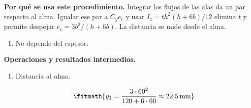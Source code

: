 \noindent\textbf{Por qué se usa este procedimiento.} Integrar los flujos de las alas da un par respecto al alma. Igualar ese par a $C_y e_c$ y usar $I_z=th^2(h+6b)/12$ elimina $t$ y permite despejar $e_c=3b^2/(h+6b)$. La distancia se mide desde el alma.

\begin{enumerate}

\item No depende del espesor.

\end{enumerate}

\noindent\textbf{Operaciones y resultados intermedios.}

\begin{enumerate}

\item Distancia al alma.

\[\fitmath{y_{1}=\frac{3\cdot {60}^{2}}{120+6\cdot 60}\approx 22{,}5\,\mathrm{mm}}\]

\end{enumerate}
